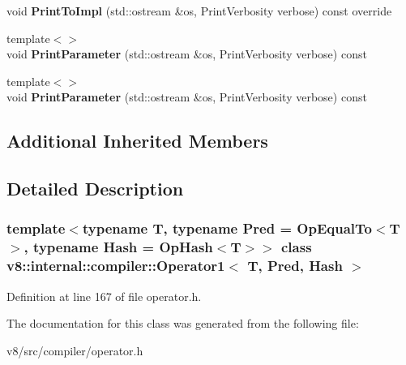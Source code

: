 \begin{DoxyCompactItemize}
void {\bfseries Print\+To\+Impl} (std\+::ostream \&os, Print\+Verbosity verbose) const override
\item 
\mbox{\label{classv8_1_1internal_1_1compiler_1_1Operator1_a91bd36aa58c730ac6b4f982ee6d0f4c0}} 
{\footnotesize template$<$$>$ }\\void {\bfseries Print\+Parameter} (std\+::ostream \&os, Print\+Verbosity verbose) const
\item 
\mbox{\label{classv8_1_1internal_1_1compiler_1_1Operator1_a91bd36aa58c730ac6b4f982ee6d0f4c0}} 
{\footnotesize template$<$$>$ }\\void {\bfseries Print\+Parameter} (std\+::ostream \&os, Print\+Verbosity verbose) const
\end{DoxyCompactItemize}
\subsection*{Additional Inherited Members}


\subsection{Detailed Description}
\subsubsection*{template$<$typename T, typename Pred = Op\+Equal\+To$<$\+T$>$, typename Hash = Op\+Hash$<$\+T$>$$>$\newline
class v8\+::internal\+::compiler\+::\+Operator1$<$ T, Pred, Hash $>$}



Definition at line 167 of file operator.\+h.



The documentation for this class was generated from the following file\+:\begin{DoxyCompactItemize}
\item 
v8/src/compiler/operator.\+h\end{DoxyCompactItemize}
